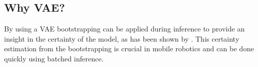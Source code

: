 \subsection*{Why VAE?}
By using a VAE bootstrapping can be applied during inference to provide an insight in the certainty of the model, as has been shown by \cite{kohl2018probabilistic}. This certainty estimation from the bootstrapping is crucial in mobile robotics and can be done quickly using batched inference.

